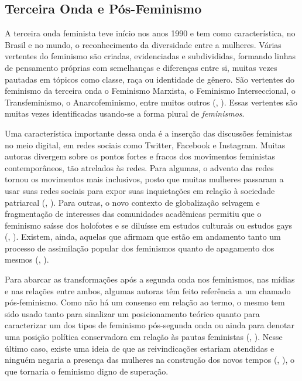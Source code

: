 \documentclass[
	12pt,				%
	openright,			%
	twoside,			%
	a4paper,			%
	english,			%
	brazil				%
	]{abntex2}
\begin{document}
 \subsection{Terceira Onda e Pós-Feminismo}
 A terceira onda feminista teve início nos anos 1990 e tem como característica, no Brasil e no mundo, o reconhecimento da diversidade entre a mulheres. Várias vertentes do feminismo são criadas, evidenciadas e subdivididas, formando linhas de pensamento próprias com semelhanças e diferenças entre si, muitas vezes pautadas em tópicos como classe, raça ou identidade de gênero. São vertentes do feminismo da terceira onda o Feminismo Marxista, o Feminismo Interseccional, o Transfeminismo, o Anarcofeminismo, entre muitos outros (, \citeyear{duarte2019}). Essas vertentes são muitas vezes identificadas usando-se a forma plural de \textit{feminismos}.

 Uma característica importante dessa onda é a inserção das discussões feministas no meio digital, em redes sociais como Twitter, Facebook e Instagram. Muitas autoras divergem sobre os pontos fortes e fracos dos movimentos feministas contemporâneos, tão atrelados às redes. Para algumas, o advento das redes tornou os movimentos mais inclusivos, posto que muitas mulheres passaram a usar suas redes sociais para expor suas inquietações em relação à sociedade patriarcal (, \citeyear{sousa2018}). Para outras, o novo contexto de globalização selvagem e fragmentação de interesses das comunidades acadêmicas permitiu que o feminismo saísse dos holofotes e se diluísse em estudos culturais ou estudos gays (, \citeyear{duarte2019}). Existem, ainda, aquelas que afirmam que estão em andamento tanto um processo de assimilação popular dos feminismos quanto de apagamento dos mesmos (, \citeyear{noronha2020}).

 Para abarcar as transformações após a segunda onda nos feminismos, nas mídias e nas relações entre ambos, algumas autoras têm feito referência a um chamado pós-feminismo. Como não há um consenso em relação ao termo, o mesmo tem sido usado tanto para sinalizar um posicionamento teórico quanto para caracterizar um dos tipos de feminismo pós-segunda onda ou ainda para denotar uma posição política conservadora em relação às pautas feministas (, \citeyear{gill2007}). Nesse último caso, existe uma ideia de que as reivindicações estariam atendidas e ninguém negaria a presença das mulheres na construção dos novos tempos (, \citeyear{duarte2019}), o que tornaria o feminismo digno de superação.
 
\end{document}
